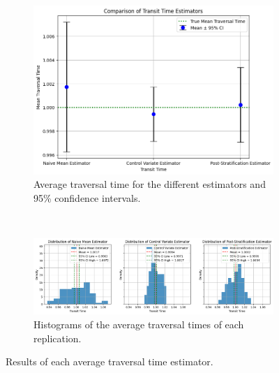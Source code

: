 \documentclass[a4paper]{article}
\begin{document}
\begin{figure}[htbp]
  \centering
  \begin{subfigure}[t]{0.8\textwidth}
    \centering
    \includegraphics[width=\textwidth]{images/ex2_p4_res.png}
    \caption{
      Average traversal time for the different estimators and 95\% confidence intervals.
    }\label{fig:e2p4-res}
  \end{subfigure}
  \\
  \begin{subfigure}[t]{\textwidth}
    \centering
    \includegraphics[width=\textwidth]{images/ex2_p4_dist.png}
    \caption{
      Histograms of the average traversal times of each replication.
    }\label{fig:e2p4-dist}
  \end{subfigure}
  \caption{
    Results of each average traversal time estimator.
  }\label{fig:e2p4}
\end{figure}
\end{document}
